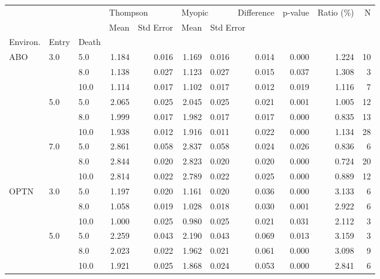\begin{tabular}{lllrrrrrrrr}
\toprule
    &     &      & \multicolumn{2}{l}{Thompson} & \multicolumn{2}{l}{Myopic} & Difference & p-value & Ratio (\%) &   N \\
    &     &      &     Mean & Std Error &   Mean & \multicolumn{5}{l}{Std Error} \\
Environ. & Entry & Death &          &           &        &           &            &         &           &     \\
\midrule
ABO & 3.0 & 5.0  &    1.184 &     0.016 &  1.169 &     0.016 &      0.014 &   0.000 &     1.224 &  10 \\
    &     & 8.0  &    1.138 &     0.027 &  1.123 &     0.027 &      0.015 &   0.037 &     1.308 &   3 \\
    &     & 10.0 &    1.114 &     0.017 &  1.102 &     0.017 &      0.012 &   0.019 &     1.116 &   7 \\
    & 5.0 & 5.0  &    2.065 &     0.025 &  2.045 &     0.025 &      0.021 &   0.001 &     1.005 &  12 \\
    &     & 8.0  &    1.999 &     0.017 &  1.982 &     0.017 &      0.017 &   0.000 &     0.835 &  13 \\
    &     & 10.0 &    1.938 &     0.012 &  1.916 &     0.011 &      0.022 &   0.000 &     1.134 &  28 \\
    & 7.0 & 5.0  &    2.861 &     0.058 &  2.837 &     0.058 &      0.024 &   0.026 &     0.836 &   6 \\
    &     & 8.0  &    2.844 &     0.020 &  2.823 &     0.020 &      0.020 &   0.000 &     0.724 &  20 \\
    &     & 10.0 &    2.814 &     0.022 &  2.789 &     0.022 &      0.025 &   0.000 &     0.889 &  12 \\
OPTN & 3.0 & 5.0  &    1.197 &     0.020 &  1.161 &     0.020 &      0.036 &   0.000 &     3.133 &   6 \\
    &     & 8.0  &    1.058 &     0.019 &  1.028 &     0.018 &      0.030 &   0.001 &     2.922 &   6 \\
    &     & 10.0 &    1.000 &     0.025 &  0.980 &     0.025 &      0.021 &   0.031 &     2.112 &   3 \\
    & 5.0 & 5.0  &    2.259 &     0.043 &  2.190 &     0.043 &      0.069 &   0.013 &     3.159 &   3 \\
    &     & 8.0  &    2.023 &     0.022 &  1.962 &     0.021 &      0.061 &   0.000 &     3.098 &   9 \\
    &     & 10.0 &    1.921 &     0.025 &  1.868 &     0.024 &      0.053 &   0.000 &     2.841 &   6 \\

\end{tabular}
